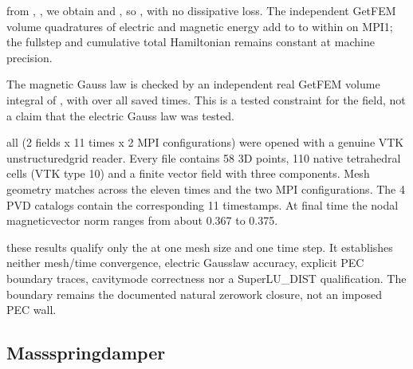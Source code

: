 \documentclass[letterpaper,10pt,english]{sphinxmanual}
\begin{document}
\sphinxAtStartPar
{} from
, ,
we obtain 
and ,
so , with
no dissipative loss. The independent GetFEM
volume quadratures of electric and magnetic
energy add to  to within
 on MPI1; the full\sphinxhyphen{}step and
cumulative total Hamiltonian remains
constant at machine precision.

\sphinxAtStartPar
The magnetic Gauss law is checked by an
independent real GetFEM volume integral
of , with
 over all saved
times. This is a tested constraint for
the  field, not a claim that
the electric Gauss law was tested.

\sphinxAtStartPar
{} all
 (2 fields x 11 times x
2 MPI configurations) were opened with
a genuine VTK unstructured\sphinxhyphen{}grid reader.
Every file contains 58 3D points,
110 native tetrahedral cells (VTK type 10)
and a finite vector field with three
components. Mesh geometry matches
across the eleven times and the two
MPI configurations. The 4 PVD catalogs
contain the corresponding 11 timestamps.
At final time the nodal magnetic\sphinxhyphen{}vector
norm ranges from about 0.367 to 0.375.

\sphinxAtStartPar
{} these results qualify
only the  at one
mesh size and one time step.
It establishes neither mesh/time convergence,
electric Gauss\sphinxhyphen{}law accuracy, explicit PEC
boundary traces, cavity\sphinxhyphen{}mode correctness
nor a SuperLU\_DIST qualification. The
boundary remains the documented natural
zero\sphinxhyphen{}work closure, not an imposed PEC wall.

\sphinxstepscope


\subsection{Mass\textendash{}spring\textendash{}damper}
\label{\detokenize{examples/mass_spring_damper:mass-spring-damper}}\label{\detokenize{examples/mass_spring_damper::doc}}
\end{document}
